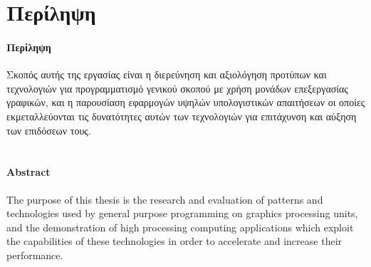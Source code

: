 \chapter{Περίληψη}
\subsubsection{Περίληψη}
Σκοπός αυτής της εργασίας είναι η διερεύνηση και αξιολόγηση προτύπων και τεχνολογιών για προγραμματισμό γενικού σκοπού με χρήση μονάδων επεξεργασίας γραφικών, και η παρουσίαση εφαρμογών υψηλών υπολογιστικών απαιτήσεων οι οποίες εκμεταλλεύονται τις δυνατότητες αυτών των τεχνολογιών για επιτάχυνση και αύξηση των επιδόσεων τους.
\\
\\
\subsubsection{Abstract}
The purpose of this thesis is the research and evaluation of patterns and technologies used by general purpose programming on graphics processing units, and the demonstration of high processing computing applications which exploit the capabilities of these technologies in order to accelerate and increase their performance.

\newpage